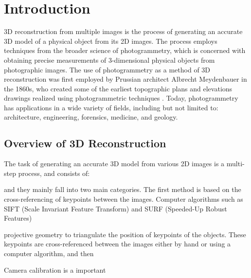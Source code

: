 \section{Introduction}

3D reconstruction from multiple images is the process of generating an accurate 3D model of a physical object from its 2D images. The process employs techniques from the broader science of photogrammetry, which is concerned with obtaining precise measurements of 3-dimensional physical objects from photographic images. The use of photogrammetry as a method of 3D reconstruction was first employed by Prussian architect Albrecht Meydenbauer in the 1860s, who created some of the earliest topographic plans and elevations drawings realized using photogrammetric techniques \autocite{ices2017}. Today, photogrammetry has applications in a wide variety of fields, including but not limited to: architecture, engineering, forensics, medicine, and geology.

\subsection{Overview of 3D Reconstruction}



The task of generating an accurate 3D model from various 2D images is a multi-step process, and consists of:




and they mainly fall into two main categories. The first method is based on the cross-referencing of keypoints between the images. Computer algorithms such as SIFT (Scale Invariant Feature Transform) and SURF (Speeded-Up Robust Features) 

projective geometry to triangulate the position of keypoints of the objects. These keypoints are cross-referenced between the images either by hand or using a computer algorithm, and then 


Camera calibration is a important 







